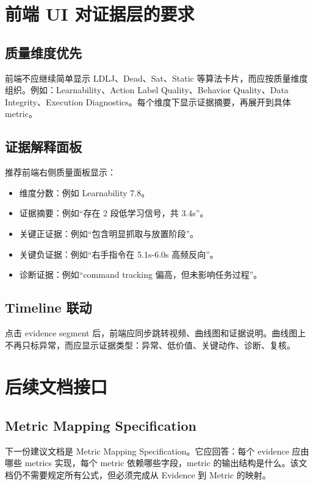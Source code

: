 \documentclass[UTF8,zihao=-4]{ctexart}
\begin{document}
\section{前端 UI 对证据层的要求}

\subsection{质量维度优先}

前端不应继续简单显示 LDLJ、Dead、Sat、Static 等算法卡片，而应按质量维度组织。例如：Learnability、Action Label Quality、Behavior Quality、Data Integrity、Execution Diagnostics。每个维度下显示证据摘要，再展开到具体 metric。

\subsection{证据解释面板}

推荐前端右侧质量面板显示：

\begin{itemize}
  \item 维度分数：例如 Learnability 7.8。
  \item 证据摘要：例如“存在 2 段低学习信号，共 3.4s”。
  \item 关键正证据：例如“包含明显抓取与放置阶段”。
  \item 关键负证据：例如“右手指令在 5.1s-6.0s 高频反向”。
  \item 诊断证据：例如“command tracking 偏高，但未影响任务过程”。
\end{itemize}

\subsection{Timeline 联动}

点击 evidence segment 后，前端应同步跳转视频、曲线图和证据说明。曲线图上不再只标异常，而应显示证据类型：异常、低价值、关键动作、诊断、复核。

\section{后续文档接口}

\subsection{Metric Mapping Specification}

下一份建议文档是 Metric Mapping Specification。它应回答：每个 evidence 应由哪些 metrics 实现，每个 metric 依赖哪些字段，metric 的输出结构是什么。该文档仍不需要规定所有公式，但必须完成从 Evidence 到 Metric 的映射。
\end{document}
